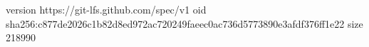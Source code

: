 version https://git-lfs.github.com/spec/v1
oid sha256:c877de2026c1b82d8ed972ac720249faeec0ac736d5773890e3afdf376ff1e22
size 218990
